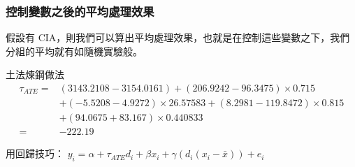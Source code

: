 \begin{frame}
    \frametitle{控制變數之後的平均處理效果}
    假設有 CIA，則我們可以算出平均處理效果，也就是在控制這些變數之下，我們分組的平均就有如隨機實驗般。
    
    土法煉鋼做法
    \begin{align*}
        \tau_{ATE} =& (3143.2108 - 3154.0161) + (206.9242 - 96.3475) \times 0.715 \\
        &+ (-5.5208 - 4.9272)\times 26.57583+(8.2981-119.8472)\times0.815 \\
        &+ (94.0675+83.167)\times 0.440833 \\
        =& -222.19
    \end{align*}
    
    用回歸技巧：
    $y_i = \alpha + \tau_{ATE} d_i + \beta x_i + \gamma(d_i (x_i - \bar{x})) + e_i$

\end{frame}